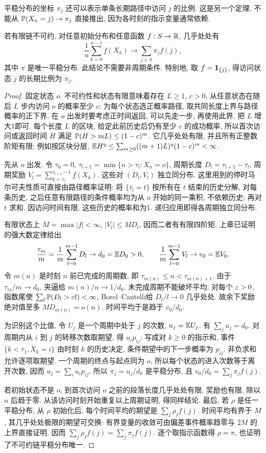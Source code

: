 平稳分布的坐标 $\pi_j$ 还可以表示单条长期路径中访问 $j$ 的比例. 这是另一个定理, 不能从 $\mathbb P(X_n=j)\to\pi_j$ 直接推出, 因为各时刻的指示变量通常依赖.
\begin{theorem}[有限不可约链的时间平均]
若有限链不可约, 对任意初始分布和任意函数 $f:S\to\mathbb R$, 几乎处处有
\[\frac1n\sum_{k=0}^{n-1}f(X_k)\longrightarrow\sum_{j\in S}\pi_jf(j),\]
其中 $\pi$ 是唯一平稳分布. 此结论不需要非周期条件. 特别地, 取 $f=\mathbf 1_{\{j\}}$, 得访问状态 $j$ 的长期比例为 $\pi_j$.
\end{theorem}
\begin{proof}
固定状态 $o$. 不可约性和状态有限意味着存在 $L\geq1$, $c>0$, 从任意状态在随后 $L$ 步内访问 $o$ 的概率至少 $c$: 为每个状态选正概率路径, 取共同长度上界与路径概率的正下界. 在 $o$ 出发时要考虑正时间返回, 可以先走一步, 再使用此界, 把 $L$ 增大1即可. 每个长度 $L$ 的区块, 给定此前历史后仍有至少 $c$ 的成功概率, 所以首次访问或返回时间 $H$ 满足
$\mathbb P(H>mL)\leq(1-c)^m$. 它几乎处处有限, 并且所有正整数阶矩有限; 例如按区块分层, $\mathbb E H^q\leq\sum_{m\geq0}((m+1)L)^q(1-c)^m<\infty$.

先从 $o$ 出发. 令 $\tau_0=0$, $\tau_{l+1}=\min\{n>\tau_l:X_n=o\}$, 周期长度 $D_l=\tau_{l+1}-\tau_l$, 周期奖励 $V_l=\sum_{k=\tau_l}^{\tau_{l+1}-1}f(X_k)$. 这些对 $(D_l,V_l)$ 独立同分布. 这里用到的停时马尔可夫性质可直接由路径概率证明: 将 $\{\tau_l=t\}$ 按所有在 $t$ 结束的历史分解, 对每条历史, 之后任意有限路径的条件概率均为从 $o$ 开始的同一乘积, 不依赖历史; 再对 $t$ 求和. 因访问时间有限, 这些历史的概率和为1. 递归应用即得各周期独立同分布.

有限状态上 $M=\max|f|<\infty$, $|V_l|\leq MD_l$, 因而二者有有限四阶矩. 上章已证明的强大数定律给出
\[\frac{\tau_m}{m}=\frac1m\sum_{l=0}^{m-1}D_l\to d_0=\mathbb E D_0>0,\qquad
\frac1m\sum_{l=0}^{m-1}V_l\to v_0=\mathbb E V_0.\]
令 $m(n)$ 是时刻 $n$ 前已完成的周期数, 即 $\tau_{m(n)}\leq n<\tau_{m(n)+1}$. 由于 $\tau_m/m\to d_0$, 夹逼给 $m(n)/n\to1/d_0$. 未完成周期不能破坏平均: 对每个 $\varepsilon>0$, 指数尾使 $\sum_l\mathbb P(D_l>\varepsilon l)<\infty$, Borel--Cantelli给 $D_l/l\to0$ 几乎处处. 故余下奖励绝对值至多 $MD_{m(n)}=o(n)$. 时间平均于是趋于 $v_0/d_0$.

为识别这个比值, 令 $U_j$ 是一个周期中处于 $j$ 的次数, $u_j=\mathbb E U_j$. 有 $\sum_j u_j=d_0$. 对周期内从 $i$ 到 $j$ 的转移次数取期望, 得 $u_i p_{ij}$: 写成对 $k\geq0$ 的指示和, 事件 $\{k<\tau_1,X_k=i\}$ 由时刻 $k$ 的历史决定, 条件期望中的下一步概率为 $p_{ij}$. 非负求和允许逐项取期望. 一个周期的终点与起点同为 $o$, 所以每个状态的进入次数等于离开次数, 因而 $u_j=\sum_i u_i p_{ij}$. 所以 $\pi_j=u_j/d_0$ 是平稳分布, 且 $v_0/d_0=\sum_j\pi_jf(j)$.

若初始状态不是 $o$, 到首次访问 $o$ 之前的段落长度几乎处处有限, 奖励也有限, 除以 $n$ 后趋于零. 从该访问时刻开始重复以上周期证明, 得同样结论. 最后, 若 $\rho$ 是任一平稳分布, 从 $\rho$ 初始化后, 每个时间平均的期望是 $\sum_j\rho_jf(j)$. 时间平均有界于 $M$, 其几乎处处极限的期望可交换: 有界变量的收敛可由偏差事件概率趋零与 $2M$ 的上界直接证明. 因而 $\sum_j\rho_jf(j)=\sum_j\pi_jf(j)$. 逐个取指示函数得 $\rho=\pi$, 也证明了不可约链平稳分布唯一.
\end{proof}
